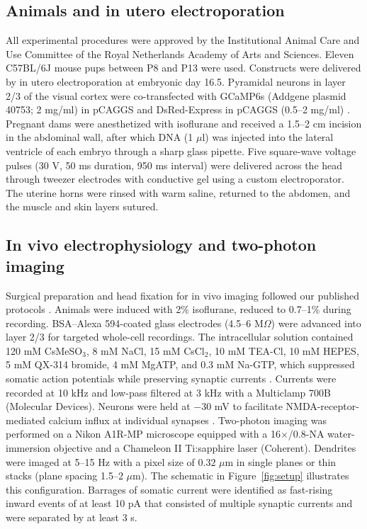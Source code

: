 \documentclass[11pt]{article}
\begin{document}
\subsection{Animals and in utero electroporation}
All experimental procedures were approved by the Institutional Animal Care and Use Committee of the Royal Netherlands Academy of Arts and Sciences. Eleven C57BL/6J mouse pups between P8 and P13 were used. Constructs were delivered by in utero electroporation at embryonic day 16.5. Pyramidal neurons in layer 2/3 of the visual cortex were co-transfected with GCaMP6s (Addgene plasmid 40753; 2 mg/ml) in pCAGGS and DsRed-Express in pCAGGS (0.5--2 mg/ml) \citep{chen2013ultrasensitive}. Pregnant dams were anesthetized with isoflurane and received a 1.5--2 cm incision in the abdominal wall, after which DNA (1 $\mu$l) was injected into the lateral ventricle of each embryo through a sharp glass pipette. Five square-wave voltage pulses (30 V, 50 ms duration, 950 ms interval) were delivered across the head through tweezer electrodes with conductive gel using a custom electroporator. The uterine horns were rinsed with warm saline, returned to the abdomen, and the muscle and skin layers sutured.

\subsection{In vivo electrophysiology and two-photon imaging}
Surgical preparation and head fixation for in vivo imaging followed our published protocols \citep{siegel2012peripheral}. Animals were induced with 2\% isoflurane, reduced to 0.7--1\% during recording. BSA--Alexa 594-coated glass electrodes (4.5--6 M$\Omega$) were advanced into layer 2/3 for targeted whole-cell recordings. The intracellular solution contained 120 mM CsMeSO$_3$, 8 mM NaCl, 15 mM CsCl$_2$, 10 mM TEA-Cl, 10 mM HEPES, 5 mM QX-314 bromide, 4 mM MgATP, and 0.3 mM Na-GTP, which suppressed somatic action potentials while preserving synaptic currents \citep{takahashi2012locally}. Currents were recorded at 10 kHz and low-pass filtered at 3 kHz with a Multiclamp 700B (Molecular Devices). Neurons were held at $-30$ mV to facilitate NMDA-receptor-mediated calcium influx at individual synapses \citep{jia2010dendritic,svoboda1999spread}. Two-photon imaging was performed on a Nikon A1R-MP microscope equipped with a 16$\times$/0.8-NA water-immersion objective and a Chameleon II Ti:sapphire laser (Coherent). Dendrites were imaged at 5--15 Hz with a pixel size of $0.32$ $\mu$m in single planes or thin stacks (plane spacing 1.5--2 $\mu$m). The schematic in Figure~\ref{fig:setup} illustrates this configuration. Barrages of somatic current were identified as fast-rising inward events of at least 10 pA that consisted of multiple synaptic currents and were separated by at least 3 s.
\end{document}
